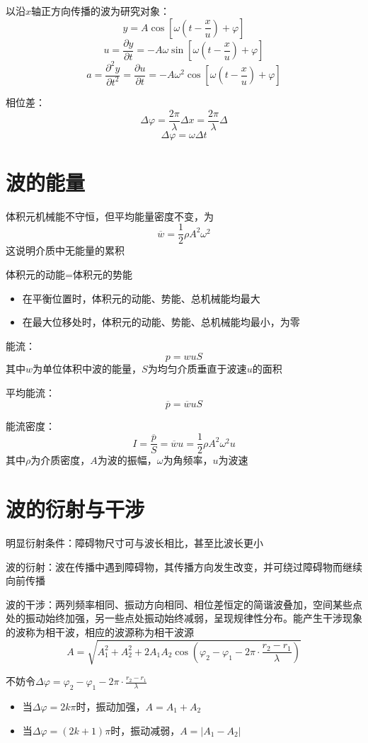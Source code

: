 \documentclass[12pt, a4paper, twoside]{ctexbook}
\begin{document}
{\sonti 以沿$x$轴正方向传播的波为研究对象}：
$$
y=A\cos\left[\omega\left(t-\frac{x}{u}\right)+\varphi\right]
$$
$$
u=\frac{\partial y}{\partial t}=-A\omega\sin\left[\omega\left(t-\frac{x}{u}\right)+\varphi\right]
$$
$$
a=\frac{\partial^2 y}{\partial t^2}=\frac{\partial u}{\partial t}=-A\omega^2\cos\left[\omega\left(t-\frac{x}{u}\right)+\varphi\right]
$$

{\sonti 相位差}：
$$
\Delta\varphi=\frac{2\pi}{\lambda}\Delta x=\frac{2\pi}{\lambda}\Delta
$$
$$
\Delta\varphi=\omega\Delta t
$$
\section{波的能量}
体积元机械能不守恒，但平均能量密度不变，为
$$
\overline{w}=\frac{1}{2}\rho A^2 \omega^2
$$
这说明介质中无能量的累积

体积元的动能=体积元的势能

\begin{itemize}
    \item 在平衡位置时，体积元的动能、势能、总机械能均最大
    \item 在最大位移处时，体积元的动能、势能、总机械能均最小，为零
\end{itemize}

{\sonti 能流}：
$$
p=wuS
$$
其中$w$为单位体积中波的能量，$S$为均匀介质垂直于波速$u$的面积

{\sonti 平均能流}：
$$
\overline{p}=\overline{w}uS
$$

{\sonti 能流密度}：
$$
I=\frac{\overline{p}}{S}=\overline{w}u=\frac{1}{2}\rho A^2 \omega^2 u
$$
其中$\rho$为介质密度，$A$为波的振幅，$\omega$为角频率，$u$为波速

\section{波的衍射与干涉}
{\sonti 明显衍射条件}：障碍物尺寸可与波长相比，甚至比波长更小

{\sonti 波的衍射}：波在传播中遇到障碍物，其传播方向发生改变，并可绕过障碍物而继续向前传播

{\sonti 波的干涉}：两列频率相同、振动方向相同、相位差恒定的简谐波叠加，空间某些点处的振动始终加强，另一些点处振动始终减弱，呈现规律性分布。能产生干涉现象的波称为相干波，相应的波源称为相干波源
$$
A=\sqrt{A_1^2+A_2^2+2A_1A_2\cos\left(\varphi_2-\varphi_1-2\pi\cdot\frac{r_2-r_1}{\lambda}\right)}
$$

不妨令$\Delta\varphi=\varphi_2-\varphi_1-2\pi\cdot\frac{r_2-r_1}{\lambda}$
\begin{itemize}
    \item 当$\Delta\varphi=2k\pi$时，振动加强，$A=A_1+A_2$
    \item 当$\Delta\varphi=\left(2k+1\right)\pi$时，振动减弱，$A=\left|A_1-A_2\right|$
\end{itemize}
\end{document}
